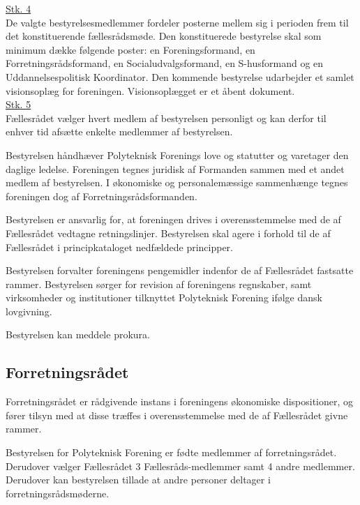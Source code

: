 \begin{list}
\underline{Stk. 4}\\
De valgte bestyrelsesmedlemmer fordeler posterne mellem sig i perioden frem til det konstituerende fællesrådsmøde. Den konstituerede bestyrelse skal som minimum dække følgende poster: en Foreningsformand, en Forretningsrådsformand, en Socialudvalgsformand, en S-husformand og en Uddannelsespolitisk Koordinator. Den kommende bestyrelse udarbejder et samlet visionsoplæg for foreningen. Visionsoplægget er et åbent dokument.\\

\underline{Stk. 5}\\ 
Fællesrådet vælger hvert medlem af bestyrelsen personligt og kan derfor til enhver tid afsætte enkelte medlemmer af bestyrelsen.\\

\item Bestyrelsen håndhæver Polyteknisk Forenings love og statutter og varetager den daglige ledelse. Foreningen tegnes juridisk af Formanden sammen med et andet medlem af bestyrelsen. I økonomiske og personalemæssige sammenhænge tegnes foreningen dog af Forretningsrådsformanden.\\

\item Bestyrelsen er ansvarlig for, at foreningen drives i overensstemmelse med de af Fællesrådet vedtagne retningslinjer. Bestyrelsen skal agere i forhold til de af Fællesrådet i principkataloget nedfældede principper.\\

\item Bestyrelsen forvalter foreningens pengemidler indenfor de af Fællesrådet fastsatte rammer. Bestyrelsen sørger for revision af foreningens regnskaber, samt virksomheder og institutioner tilknyttet Polyteknisk Forening ifølge dansk lovgivning.

\item Bestyrelsen kan meddele prokura.

\subsection{Forretningsrådet}
\item Forretningsrådet er rådgivende instans i foreningens økonomiske dispositioner, og fører tilsyn med at disse træffes i overensstemmelse med de af Fællesrådet givne rammer.\\

\item Bestyrelsen for Polyteknisk Forening er fødte medlemmer af forretningsrådet. Derudover vælger Fællesrådet 3 Fællesråds-medlemmer samt 4 andre medlemmer. Derudover kan bestyrelsen tillade at andre personer deltager i forretningsrådsmøderne.


\end{list}

